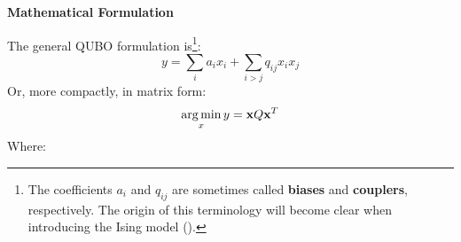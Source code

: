 \highspace
\begin{flushleft}
    \textcolor{Green3}{ \textbf{Mathematical Formulation}}
\end{flushleft}
The general QUBO formulation is\footnote{%
    The coefficients $a_{i}$ and $q_{ij}$ are sometimes called \textbf{biases} and \textbf{couplers}, respectively. The origin of this terminology will become clear when introducing the Ising model ().
}:
\begin{equation}\label{eq:qubo-formulation}
    y = \sum_{i} a_{i} x_{i} + \sum_{i > j} q_{ij} x_{i} x_{j}
\end{equation}
Or, more compactly, in matrix form:
\begin{equation}
    \operatorname*{arg\,min}_{x} y = \mathbf{x} Q \mathbf{x}^{T}
\end{equation}
Where:
